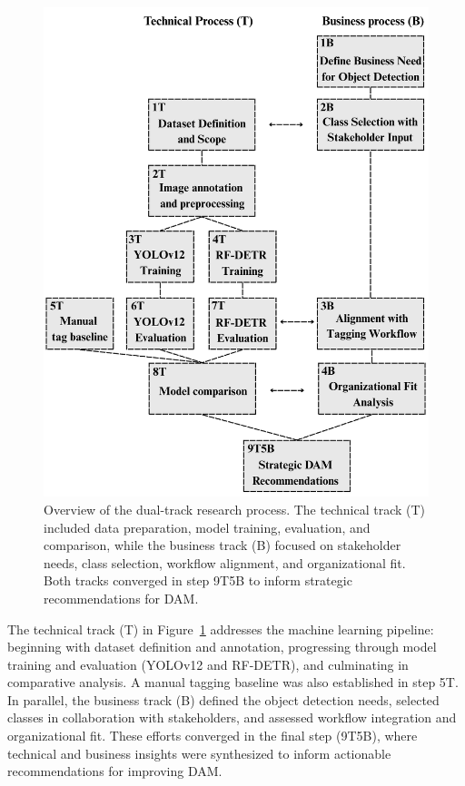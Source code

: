 \documentclass[a4paper,10pt,twocolumn]{article}
\numberwithin{figure}{section}
\numberwithin{table}{section}
\begin{document}
\begin{figure}[htbp]
    \centering
    \includegraphics[width=1\linewidth]{map.png}
    \caption{Overview of the dual-track research process. The technical track (T) included data preparation, model training, evaluation, and comparison, while the business track (B) focused on stakeholder needs, class selection, workflow alignment, and organizational fit. Both tracks converged in step 9T5B to inform strategic recommendations for DAM.}
    \label{fig:research-process}
\end{figure}

The technical track (T) in Figure~\ref{fig:research-process} 
addresses the machine learning pipeline: beginning with dataset 
definition and annotation, progressing through model training 
and evaluation (YOLOv12 and RF-DETR), and culminating in 
comparative analysis. A manual tagging baseline was also 
established in step 5T. In parallel, the business track (B) defined the object detection 
needs, selected classes in collaboration with stakeholders, 
and assessed workflow integration and organizational fit.
These efforts converged in the final step (9T5B), where technical 
and business insights were synthesized to inform actionable 
recommendations for improving DAM.
\end{document}
